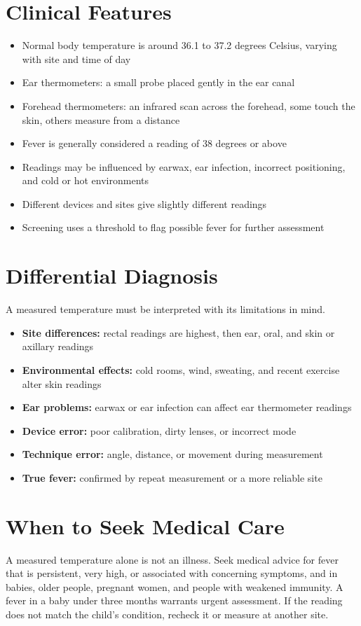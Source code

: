 \section*{Clinical Features}
\begin{itemize}
    \item Normal body temperature is around 36.1 to 37.2 degrees Celsius, varying with site and time of day
    \item Ear thermometers: a small probe placed gently in the ear canal
    \item Forehead thermometers: an infrared scan across the forehead, some touch the skin, others measure from a distance
    \item Fever is generally considered a reading of 38 degrees or above
    \item Readings may be influenced by earwax, ear infection, incorrect positioning, and cold or hot environments
    \item Different devices and sites give slightly different readings
    \item Screening uses a threshold to flag possible fever for further assessment
\end{itemize}

\section*{Differential Diagnosis}
A measured temperature must be interpreted with its limitations in mind.
\begin{itemize}
    \item \textbf{Site differences:} rectal readings are highest, then ear, oral, and skin or axillary readings
    \item \textbf{Environmental effects:} cold rooms, wind, sweating, and recent exercise alter skin readings
    \item \textbf{Ear problems:} earwax or ear infection can affect ear thermometer readings
    \item \textbf{Device error:} poor calibration, dirty lenses, or incorrect mode
    \item \textbf{Technique error:} angle, distance, or movement during measurement
    \item \textbf{True fever:} confirmed by repeat measurement or a more reliable site
\end{itemize}

\section*{When to Seek Medical Care}
A measured temperature alone is not an illness. Seek medical advice for fever that is persistent, very high, or associated with concerning symptoms, and in babies, older people, pregnant women, and people with weakened immunity. A fever in a baby under three months warrants urgent assessment. If the reading does not match the child's condition, recheck it or measure at another site.


